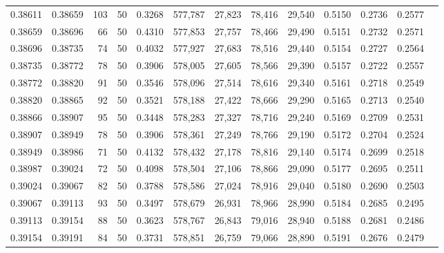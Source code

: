 \begin{tabular}{rrrrrrrrrrrrr}
0.38611 & 0.38659 &   103 &  50 &                                     0.3268 & 577,787 &  27,823 &  78,416 &  29,540 & 0.5150 & 0.2736 & 0.2577 \\
0.38659 & 0.38696 &    66 &  50 &                                     0.4310 & 577,853 &  27,757 &  78,466 &  29,490 & 0.5151 & 0.2732 & 0.2571 \\
0.38696 & 0.38735 &    74 &  50 &                                     0.4032 & 577,927 &  27,683 &  78,516 &  29,440 & 0.5154 & 0.2727 & 0.2564 \\
0.38735 & 0.38772 &    78 &  50 &                                     0.3906 & 578,005 &  27,605 &  78,566 &  29,390 & 0.5157 & 0.2722 & 0.2557 \\
0.38772 & 0.38820 &    91 &  50 &                                     0.3546 & 578,096 &  27,514 &  78,616 &  29,340 & 0.5161 & 0.2718 & 0.2549 \\
0.38820 & 0.38865 &    92 &  50 &                                     0.3521 & 578,188 &  27,422 &  78,666 &  29,290 & 0.5165 & 0.2713 & 0.2540 \\
0.38866 & 0.38907 &    95 &  50 &                                     0.3448 & 578,283 &  27,327 &  78,716 &  29,240 & 0.5169 & 0.2709 & 0.2531 \\
0.38907 & 0.38949 &    78 &  50 &                                     0.3906 & 578,361 &  27,249 &  78,766 &  29,190 & 0.5172 & 0.2704 & 0.2524 \\
0.38949 & 0.38986 &    71 &  50 &                                     0.4132 & 578,432 &  27,178 &  78,816 &  29,140 & 0.5174 & 0.2699 & 0.2518 \\
0.38987 & 0.39024 &    72 &  50 &                                     0.4098 & 578,504 &  27,106 &  78,866 &  29,090 & 0.5177 & 0.2695 & 0.2511 \\
0.39024 & 0.39067 &    82 &  50 &                                     0.3788 & 578,586 &  27,024 &  78,916 &  29,040 & 0.5180 & 0.2690 & 0.2503 \\
0.39067 & 0.39113 &    93 &  50 &                                     0.3497 & 578,679 &  26,931 &  78,966 &  28,990 & 0.5184 & 0.2685 & 0.2495 \\
0.39113 & 0.39154 &    88 &  50 &                                     0.3623 & 578,767 &  26,843 &  79,016 &  28,940 & 0.5188 & 0.2681 & 0.2486 \\
0.39154 & 0.39191 &    84 &  50 &                                     0.3731 & 578,851 &  26,759 &  79,066 &  28,890 & 0.5191 & 0.2676 & 0.2479 \\

\end{tabular}
